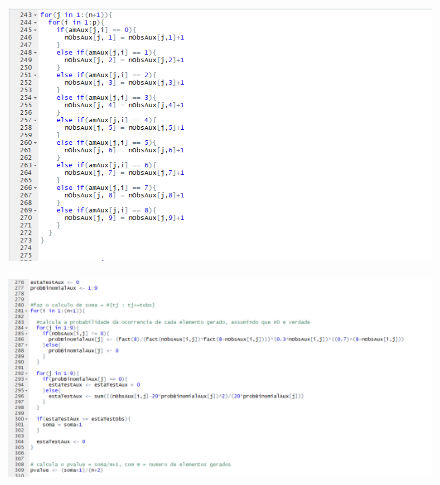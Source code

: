 \documentclass{article}
\begin{document}
				\begin{figure}[!h]
					\includegraphics[scale=0.45]{oi3}
				\end{figure}
				\begin{figure}[!h]
					\includegraphics[scale=0.45]{oi4}
				\end{figure}
			
\end{document}
